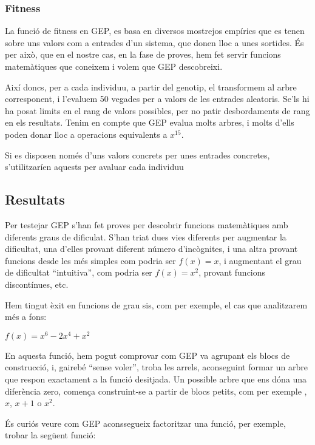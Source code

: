 \documentclass[titlepage,a4paper,12pt]{book}
\begin{document}
\subsubsection{Fitness} %
\label{ssub:Fitness}
La funció de fitness en GEP, es basa en diversos mostrejos empírics que es tenen sobre uns valors
com a entrades d'un sistema, que donen lloc a unes sortides.  És per això, que en el nostre cas,
en la fase de proves, hem fet servir funcions matemàtiques que coneixem i volem que GEP descobreixi.

Així doncs, per a cada individuu, a partir del genotip, el transformem al arbre corresponent, i
l'evaluem 50 vegades per a valors de les entrades aleatoris.  Se'ls hi ha posat limits en el rang de
valors possibles, per no patir desbordaments de rang en els resultats.  Tenim en compte que GEP
evalua molts arbres, i molts d'ells poden donar lloc a operacions equivalents a $x^15$.

Si es disposen només d'uns valors concrets per unes entrades concretes, s'utilitzaríen aquests per
avaluar cada individuu %


\subsection{Resultats} %
\label{sub:GResultats}

Per testejar GEP s'han fet proves per descobrir funcions matemàtiques amb diferents graus de
dificulat.  S'han triat dues vies diferents per augmentar la dificultat, una d'elles provant
diferent número d'incògnites, i una altra provant funcions desde les més simples com podria ser
$f(x)=x$, i augmentant el grau de dificultat ``intuitiva'', com podria ser $f(x)=x^2$, provant
funcions discontínues, etc.

Hem tingut èxit en funcions de grau sis, com per exemple, el cas que analitzarem més a fons:

\begin{center}
	\label{fun1} 
	$f(x)=x^6-2x^4+x^2$
\end{center}


En aquesta funció, hem pogut comprovar com GEP va agrupant els blocs de construcció, i, gairebé
``sense voler'', troba les arrels, aconseguint formar un arbre que respon exactament a la funció
desitjada. Un possible arbre que ens dóna una diferència zero, comença construint-se a partir de
blocs petits, com per exemple , $x$, $x+1$ o $x^2$.


És curiós veure com GEP aconssegueix factoritzar una funció, per exemple, trobar la següent funció:
\end{document}
